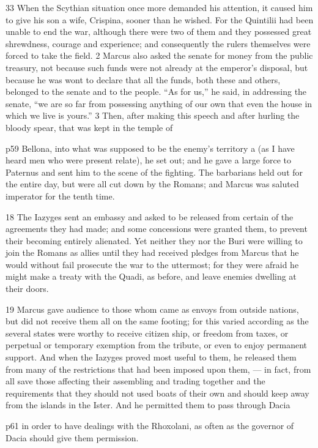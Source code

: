 33
When the Scythian situation once more demanded his attention, it caused him to give his son a wife, Crispina, sooner than he wished. For the Quintilii had been unable to end the war, although there were two of them and they possessed great shrewdness, courage and experience; and consequently the rulers themselves were forced to take the field. 2 Marcus also asked the senate for money from the public treasury, not because such funds were not already at the emperor's disposal, but because he was wont to declare that all the funds, both these and others, belonged to the senate and to the people. ``As for us,'' he said, in addressing the senate, ``we are so far from possessing anything of our own that even the house in which we live is yours.'' 3 Then, after making this speech and after hurling the bloody spear, that was kept in the temple of

p59 Bellona, into what was supposed to be the enemy's territory\texthebrew{⁠} a (as I have heard men who were present relate), he set out; and he gave a large force to Paternus and sent him to the scene of the fighting. The barbarians held out for the entire day, but were all cut down by the Romans; and Marcus was saluted imperator for the tenth time.

18
The Iazyges sent an embassy and asked to be released from certain of the agreements they had made; and some concessions were granted them, to prevent their becoming entirely alienated. Yet neither they nor the Buri were willing to join the Romans as allies until they had received pledges from Marcus that he would without fail prosecute the war to the uttermost; for they were afraid he might make a treaty with the Quadi, as before, and leave enemies dwelling at their doors.

19
Marcus gave audience to those whom came as envoys from outside nations, but did not receive them all on the same footing; for this varied according as the several states were worthy to receive citizen ­ship, or freedom from taxes, or perpetual or temporary exemption from the tribute, or even to enjoy permanent support. And when the Iazyges proved most useful to them, he released them from many of the restrictions that had been imposed upon them, \texthebrew{—} in fact, from all save those affecting their assembling and trading together and the requirements that they should not used boats of their own and should keep away from the islands in the Ister. And he permitted them to pass through Dacia

p61 in order to have dealings with the Rhoxolani, as often as the governor of Dacia should give them permission.

